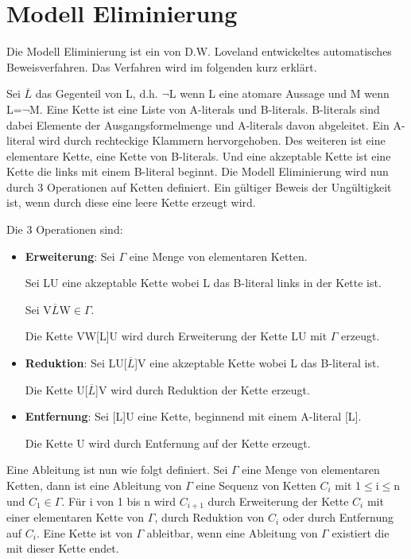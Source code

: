 \section{Modell Eliminierung}
Die Modell Eliminierung ist ein von D.W. Loveland entwickeltes automatisches Beweisverfahren. \cite{atp_d_loveland} Das Verfahren wird im folgenden kurz erklärt.

Sei $\overline{L}$ das Gegenteil von L, d.h. $\neg$L wenn L eine atomare Aussage und M wenn L=$\neg$M. Eine Kette ist eine Liste von A-literals und B-literals. B-literals sind dabei Elemente der Ausgangsformelmenge und A-literals davon abgeleitet. Ein A-literal wird durch rechteckige Klammern hervorgehoben. Des weiteren ist eine elementare Kette, eine Kette von B-literals. Und eine akzeptable Kette ist eine Kette die links mit einem B-literal beginnt. Die Modell Eliminierung wird nun durch 3 Operationen auf Ketten definiert. Ein gültiger Beweis der Ungültigkeit ist, wenn durch diese eine leere Kette erzeugt wird. \cite{model_elimination}

Die 3 Operationen sind:
\begin{itemize}
\item \textbf{Erweiterung}: Sei $\Gamma$ eine Menge von elementaren Ketten.

Sei LU eine akzeptable Kette wobei L das B-literal links in der Kette ist.

Sei V$\overline{L}$W$\in \Gamma$.

Die Kette VW[L]U wird durch Erweiterung der Kette LU mit $\Gamma$ erzeugt.

\item \textbf{Reduktion}: Sei LU[$\overline{L}$]V eine akzeptable Kette wobei L das B-literal ist.

Die Kette U[$\overline{L}$]V wird durch Reduktion der Kette erzeugt.

\item \textbf{Entfernung}: Sei [L]U eine Kette, beginnend mit einem A-literal [L].

Die Kette U wird durch Entfernung auf der Kette erzeugt.
\end{itemize}

Eine Ableitung ist nun wie folgt definiert. Sei $\Gamma$ eine Menge von elementaren Ketten, dann ist eine Ableitung von $\Gamma$ eine Sequenz von Ketten $C_{i}$ mit 1$\leq$i$\leq$n und $C_{1}\in \Gamma$. Für i von 1 bis n wird $C_{i+1}$ durch Erweiterung der Kette $C_{i}$ mit einer elementaren Kette von $\Gamma$, durch Reduktion von $C_{i}$ oder durch Entfernung auf $C_{i}$. Eine Kette ist von $\Gamma$ ableitbar, wenn eine Ableitung von $\Gamma$ existiert die mit dieser Kette endet. \cite{model_elimination}

